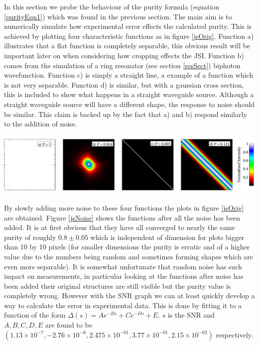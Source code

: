 In this section we probe the behaviour of the purity formula (equation \ref{purityEqn1}) which was found in the previous section. The main aim is to numerically simulate how experimental error effects the calculated purity. This is achieved by plotting four characteristic functions as in figure \ref{jsOrig}. Function a) illustrates that a flat function is completely separable, this obvious result will be important later on when considering how cropping effects the JSI. Function b) comes from the simulation of a ring resonator (see section \ref{resSect}) biphoton wavefunction. Function c) is simply a straight line, a example of a function which is not very separable. Function d) is similar, but with a gaussian cross section, this is included to show what happens in a straight waveguide source. Although a straight waveguide source will have a different shape, the response to noise should be similar. This claim is backed up by the fact that a) and b) respond similarly to the addition of noise.

\begingroup
\centering
    \includegraphics[width=17cm]{res/theory/js_original.pdf}
\label{jsOrig}
\endgroup

By slowly adding more noise to these four functions the plots in figure \ref{jsOrig} are obtained. Figure \ref{jsNoise} shows the functions after all the noise has been added. It is at first obvious that they have all converged to nearly the same purity of roughly $0.8\pm0.05$ which is independent of dimension for plots bigger than 10 by 10 pixels (for smaller dimensions the purity is erratic and of a higher value due to the numbers being random and sometimes forming shapes which are even more separable). It is somewhat unfortunate that random noise has such impact on measurements, in particular looking at the functions after noise has been added their original structures are still visible but the purity value is completely wrong. However with the SNR graph we can at least quickly develop a way to calculate the error in experimental data. This is done by fitting it to a function of the form $\Delta(s) = Ae^{-Bs}+Ce^{-Ds}+E$. $s$ is the SNR and $A,B,C,D,E$ are found to be $(1.13\times 10^{-7},-2.76\times 10^{-6},2.475\times 10^{-01},3.77\times 10^{-01},2.15\times 10^{-02})$ respectively.

